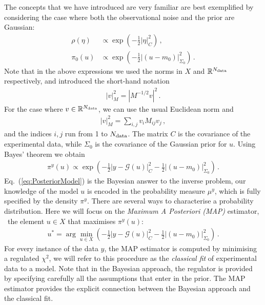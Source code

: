 The concepts that we have introduced are very familiar are best exemplified
by considering the case where both the observational noise and the
prior are Gaussian:
\begin{align}
  \label{eq:RhoGauss}
  \rho(\eta) &\propto \exp\left(
               -\frac12 \left|\eta\right|_C^2
               \right)\, , \\
  \label{eq:PiZeroGauss}
  \pi_0(u)  &\propto \exp\left(
              -\frac12 \left|(u-m_0)\right|_{\Sigma_0}^2
              \right)\, .
\end{align}
Note that in the above expressions we used the norms in $X$ and
$\mathbb{R}^{N_{\rm data}}$ respectively, and introduced the short-hand
notation
\begin{align}
  \left|v\right|_M^2 = \left| M^{-1/2} v\right|^2\, .
\end{align}
For the case where $v \in \mathbb{R}^{N_{\rm data}}$, we can use the usual
Euclidean norm  and
\begin{align}
  \left|v\right|_M^2 = \sum_{i,j} v_i M_{ij} v_j\, ,
\end{align}
and the indices $i,j$ run from 1 to $N_{\rm data}$.  The matrix $C$ is the
covariance of the experimental data, while $\Sigma_0$ is the
covariance of the Gaussian prior for $u$. Using Bayes' theorem we
obtain
\begin{align}
  \label{eq:PosteriorModel}
  \pi^y(u) \propto 
  \exp\left(
  -\frac12 \left|y - \mathcal G(u)\right|_C^2
  -\frac12 \left|(u-m_0)\right|_{\Sigma_0}^2
  \right)\, .
\end{align}
Eq.~(\ref{eq:PosteriorModel}) is the Bayesian answer to the inverse
problem, our knowledge of the model $u$ is encoded in the probability
measure $\mu^y$, which is fully specified by the density
$\pi^y$. There are several ways to characterise a probability
distribution. Here we will focus on the {\em Maximum A Posteriori
  (MAP)} estimator, \ie\ the element $u \in X$ that maximises
$\pi^y(u)$:
\begin{align}\label{eq:MAP}
  u^* = \arg\min_{u \in X} 
  \left(
  -\frac12 \left|y - \mathcal G(u)\right|_C^2
  -\frac12 \left|(u-m_0)\right|_{\Sigma_0}^2
  \right)\, .
\end{align}
For every instance of the data $y$, the MAP estimator is computed by
minimising a regulated $\chi^2$, we will refer to this procedure as
the {\em classical fit} of experimental data to a model. Note that in
the Bayesian approach, the regulator is provided by specifying
carefully all the assumptions that enter in the prior. The MAP
estimator provides the explicit connection between the Bayesian
approach and the classical fit.

